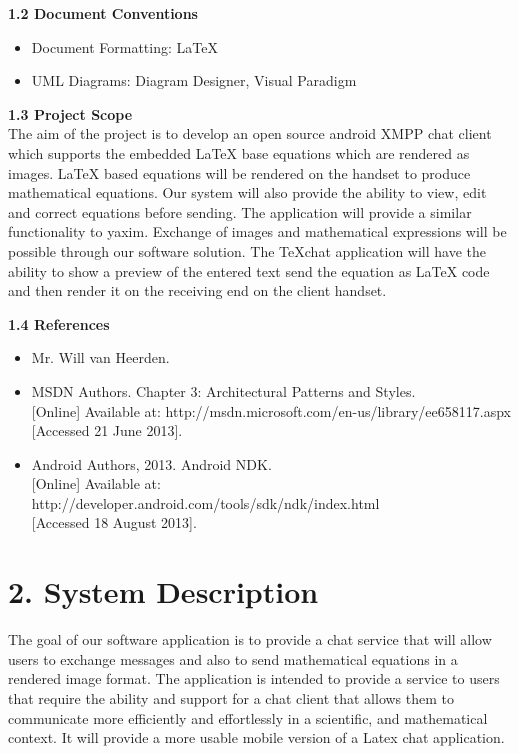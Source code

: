 \documentclass[29pt,a4paper]{moderncv}
\begin{document}
		\noindent \textbf{1.2 Document Conventions}
			\begin{itemize}
				\item Document Formatting: LaTeX
				\item UML Diagrams: Diagram Designer, Visual Paradigm
			\end{itemize}
		\vspace{5mm}
		
		\noindent \textbf{1.3 Project Scope}
			\\The aim of the project is to develop an open source android XMPP chat client which supports the embedded LaTeX base equations which are rendered as images. LaTeX based equations will be rendered on the handset to produce mathematical equations. Our system will also provide the ability to view, edit and correct equations before sending.
			\parindent 5mm The application will provide a similar functionality to yaxim. Exchange of images and mathematical expressions will be possible through our software solution. The TeXchat application will have the ability to show a preview of the entered text send the equation as LaTeX code and then render it on the receiving end on the client handset.
			
		\vspace{5mm}
		
	\noindent \textbf{1.4 References}
		\begin{itemize}
		\item Mr. Will van Heerden.
			\item MSDN Authors. Chapter 3: Architectural Patterns and Styles. 
			\\{[Online]} Available at: http://msdn.microsoft.com/en-us/library/ee658117.aspx
			\\{[Accessed 21 June 2013].}
			
			\item Android Authors, 2013. Android NDK.\\ {[Online]} Available at: http://developer.android.com/tools/sdk/ndk/index.html
				\\{[Accessed 18 August 2013].}
		\end{itemize}
		\vspace{5mm}
		
\newpage
	\section*{\textbf{2. System Description}}
	\vspace{4mm}
		\noindent The goal of our software application is to provide a chat service that will allow users to exchange messages and also to send mathematical equations in a rendered image format.  The application is intended to provide a service to users that require the ability and support for a chat client that allows them to communicate more efficiently and effortlessly in a scientific, and mathematical context.  It will provide a more usable mobile version of a Latex chat application.\\ 
		
\end{document}
